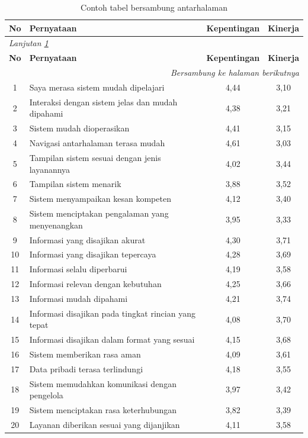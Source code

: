 \begin{longtable}{|c|p{6.5cm}|c|c|}
    \caption{Contoh tabel bersambung antarhalaman}
    \label{tab:g-longtable} \\
    \hline
    \textbf{No} & \textbf{Pernyataan} & \textbf{Kepentingan} & \textbf{Kinerja} \\ \hline
    \endfirsthead

    \multicolumn{4}{l}{\footnotesize\textit{Lanjutan \cref{tab:g-longtable}}} \\
    \hline
    \textbf{No} & \textbf{Pernyataan} & \textbf{Kepentingan} & \textbf{Kinerja} \\ \hline
    \endhead

    \hline
    \multicolumn{4}{r}{\footnotesize\textit{Bersambung ke halaman berikutnya}} \\
    \endfoot

    \hline
    \endlastfoot

    1  & Saya merasa sistem mudah dipelajari & 4,44 & 3,10 \\ \hline
    2  & Interaksi dengan sistem jelas dan mudah dipahami & 4,38 & 3,21 \\ \hline
    3  & Sistem mudah dioperasikan & 4,41 & 3,15 \\ \hline
    4  & Navigasi antarhalaman terasa mudah & 4,61 & 3,03 \\ \hline
    5  & Tampilan sistem sesuai dengan jenis layanannya & 4,02 & 3,44 \\ \hline
    6  & Tampilan sistem menarik & 3,88 & 3,52 \\ \hline
    7  & Sistem menyampaikan kesan kompeten & 4,12 & 3,40 \\ \hline
    8  & Sistem menciptakan pengalaman yang menyenangkan & 3,95 & 3,33 \\ \hline
    9  & Informasi yang disajikan akurat & 4,30 & 3,71 \\ \hline
    10 & Informasi yang disajikan tepercaya & 4,28 & 3,69 \\ \hline
    11 & Informasi selalu diperbarui & 4,19 & 3,58 \\ \hline
    12 & Informasi relevan dengan kebutuhan & 4,25 & 3,66 \\ \hline
    13 & Informasi mudah dipahami & 4,21 & 3,74 \\ \hline
    14 & Informasi disajikan pada tingkat rincian yang tepat & 4,08 & 3,70 \\ \hline
    15 & Informasi disajikan dalam format yang sesuai & 4,15 & 3,68 \\ \hline
    16 & Sistem memberikan rasa aman & 4,09 & 3,61 \\ \hline
    17 & Data pribadi terasa terlindungi & 4,18 & 3,55 \\ \hline
    18 & Sistem memudahkan komunikasi dengan pengelola & 3,97 & 3,42 \\ \hline
    19 & Sistem menciptakan rasa keterhubungan & 3,82 & 3,39 \\ \hline
    20 & Layanan diberikan sesuai yang dijanjikan & 4,11 & 3,58 \\ \hline
\end{longtable}

